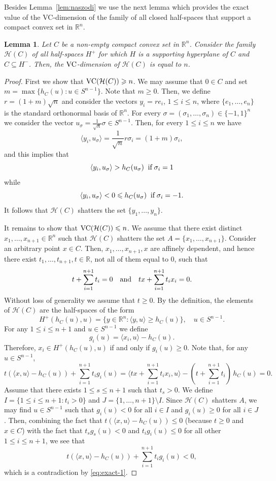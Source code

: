 \documentclass[11pt,leqno]{article}
\newtheorem{lemma}[theorem]{Lemma}
\theoremstyle{definition}
\theoremstyle{remark}
\numberwithin{equation}{section}
\newcommand{\ls}{\leqslant}
\newcommand{\gr}{\geqslant}
\newcommand{\1}{\textbf{1}}
\begin{document}
Besides Lemma~\ref{lem:naszodi} we use the next lemma which provides the exact value of the VC-dimension of the
family of all closed half-spaces that support a compact convex set in $\mathbb{R}^n$.

\begin{lemma}\label{lem:exact-vc}Let $C$ be a non-empty compact convex set in $\mathbb{R}^n$.
Consider the family $\mathcal{H}(C)$ of all half-spaces $H^+$ for which $H$ is a supporting hyperplane
of $C$ and $C\subseteq H^-$. Then, the ${\rm VC}$-dimension of $\mathcal{H}(C)$ is equal to $n$.
\end{lemma}

\begin{proof}First we show that ${\rm VC}(\mathcal{H}(C))\gr n$. We may assume that $0\in C$ and set
$m=\max\{h_C(u):u\in S^{n-1}\}$. Note that $m\gr 0$. Then, we define $r=(1+m)\sqrt{n}$ and consider
the vectors $y_i=re_i$, $1\ls i\ls n$, where $\{e_1,\ldots ,e_n\}$ is the standard orthonormal
basis of $\mathbb{R}^n$. For every $\sigma=(\sigma_1,\ldots ,\sigma_n)\in\{-1,1\}^n$ we consider the vector
$u_{\sigma}=\frac{1}{\sqrt{n}}\sigma\in S^{n-1}$. Then, for every $1\ls i\ls n$ we have
$$\langle y_i,u_{\sigma}\rangle =\frac{1}{\sqrt{n}}r\sigma_i=(1+m)\sigma_i,$$
and this implies that
$$\langle y_i,u_{\sigma}\rangle >h_C(u_{\sigma})\;\;\hbox{if}\;\sigma_i=1$$
while
$$\langle y_i,u_{\sigma}\rangle <0\ls h_C(u_{\sigma})\;\;\hbox{if}\;\sigma_i=-1.$$
It follows that $\mathcal{H}(C)$ shatters the set $\{y_1,\ldots ,y_n\}$.

It remains to show that ${\rm VC}(\mathcal{H}(C))\ls n$. We assume that there exist distinct
$x_1,\ldots ,x_{n+1}\in\mathbb{R}^n$ such that $\mathcal{H}(C)$ shatters the set $A=\{x_1,\ldots ,x_{n+1}\}$.
Consider an arbitrary point $x\in C$. Then, $x_1,\ldots ,x_{n+1},x$ are affinely dependent, and hence there
exist $t_1,\ldots ,t_{n+1},t\in\mathbb{R}$, not all of them equal to $0$, such that
$$t+\sum_{i=1}^{n+1}t_i=0\quad\hbox{and}\quad tx+\sum_{i=1}^{n+1}t_ix_i=0.$$
Without loss of generality we assume that $t\gr 0$. By the definition, the elements of $\mathcal{H}(C)$
are the half-spaces of the form
$$H^+(h_C(u),u)=\{y\in\mathbb{R}^n:\langle y,u\rangle \gr h_C(u)\},\quad u\in S^{n-1}.$$
For any $1\ls i\ls n+1$ and $u\in S^{n-1}$ we define
$$g_i(u)=\langle x_i,u\rangle -h_C(u).$$
Therefore, $x_i\in H^+(h_C(u),u)$ if and only if $g_i(u)\gr 0$. Note that, for any $u\in S^{n-1}$,
\begin{equation}\label{eq:exact-1}t(\langle x,u\rangle -h_C(u))+\sum_{i=1}^{n+1}t_ig_i(u)
=\Big\langle tx+\sum_{i=1}^{n+1}t_ix_i,u\Big\rangle -\left(t+\sum_{i=1}^{n+1}t_i\right)\,h_C(u)=0.\end{equation}
Assume that there exists $1\ls s\ls n+1$ such that $t_s>0$. We define $I=\{1\ls i\ls n+1:t_i>0\}$
and $J=\{1,\ldots ,n+1\}\setminus I$. Since $\mathcal{H}(C)$ shatters $A$, we
may find $u\in S^{n-1}$ such that $g_i(u)<0$ for all $i\in I$ and $g_i(u)\gr 0$ for all $i\in J$.
Then, combining the fact that $t(\langle x,u\rangle -h_C(u))\ls 0$ (because $t\gr 0$ and $x\in C$) with the fact
that $t_sg_s(u)<0$ and $t_ig_i(u)\ls 0$ for all other $1\ls i\ls n+1$, we see that
$$t(\langle x,u\rangle -h_C(u))+\sum_{i=1}^{n+1}t_ig_i(u)<0,$$
which is a contradiction by \eqref{eq:exact-1}.


\end{proof}
\end{document}
